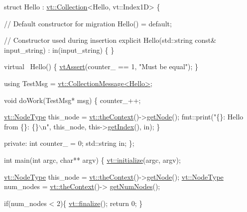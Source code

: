 \begin{DoxyCodeInclude}
\textcolor{keyword}{struct }Hello : \hyperlink{structvt_1_1vrt_1_1collection_1_1_collection}{vt::Collection}<Hello, vt::Index1D> \{

  \textcolor{comment}{// Default constructor for migration}
  Hello() = \textcolor{keywordflow}{default};

  \textcolor{comment}{// Constructor used during insertion}
  \textcolor{keyword}{explicit} Hello(std::string \textcolor{keyword}{const}& input\_string)
    : in(input\_string)
  \{ \}

  \textcolor{keyword}{virtual} ~Hello() \{
    \hyperlink{config__assert_8h_aeddd4990a496e91a0ca5d6c16437359b}{vtAssert}(counter\_ == 1, \textcolor{stringliteral}{"Must be equal"});
  \}

  \textcolor{keyword}{using} TestMsg = \hyperlink{structvt_1_1vrt_1_1collection_1_1_collection_message}{vt::CollectionMessage<Hello>};

  \textcolor{keywordtype}{void} doWork(TestMsg* msg) \{
    counter\_++;

    \hyperlink{namespacevt_a866da9d0efc19c0a1ce79e9e492f47e2}{vt::NodeType} this\_node = \hyperlink{namespacevt_a26551fe0e6e6a1371111df5b12c7e92c}{vt::theContext}()->\hyperlink{structvt_1_1ctx_1_1_context_a0d52c263ce8516546a67443d9a86fa5f}{getNode}();
    fmt::print(\textcolor{stringliteral}{"\{\}: Hello from \{\}: \{\}\(\backslash\)n"}, this\_node, this->\hyperlink{structvt_1_1vrt_1_1collection_1_1_indexable_a28d05f23e7a20e12e94b8235305c1e82}{getIndex}(), in);
  \}

\textcolor{keyword}{private}:
  \textcolor{keywordtype}{int} counter\_ = 0;
  std::string in;
\};

\textcolor{keywordtype}{int} main(\textcolor{keywordtype}{int} argc, \textcolor{keywordtype}{char}** argv) \{
  \hyperlink{namespacevt_aae6ab5af3e11886ce73c4c3ffa008201}{vt::initialize}(argc, argv);

  \hyperlink{namespacevt_a866da9d0efc19c0a1ce79e9e492f47e2}{vt::NodeType} this\_node = \hyperlink{namespacevt_a26551fe0e6e6a1371111df5b12c7e92c}{vt::theContext}()->\hyperlink{structvt_1_1ctx_1_1_context_a0d52c263ce8516546a67443d9a86fa5f}{getNode}();
  \hyperlink{namespacevt_a866da9d0efc19c0a1ce79e9e492f47e2}{vt::NodeType} num\_nodes = \hyperlink{namespacevt_a26551fe0e6e6a1371111df5b12c7e92c}{vt::theContext}()->
      \hyperlink{structvt_1_1ctx_1_1_context_a7f41071aadf6d5fa9e1b6c703c5ff19d}{getNumNodes}();

  \textcolor{keywordflow}{if}(num\_nodes < 2)\{
    \hyperlink{namespacevt_a540d90dbd6e97b69f1dcbc9ee9314cff}{vt::finalize}();
    \textcolor{keywordflow}{return} 0;
  \}


\end{DoxyCodeInclude}
